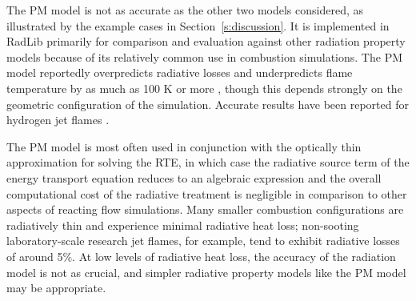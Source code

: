 \documentclass[preprint,12pt]{elsarticle}
\begin{document}
The PM model is not as accurate as the other two models considered, as illustrated by the example cases in Section~\ref{s:discussion}.
It is implemented in RadLib primarily for comparison and evaluation against other radiation property models because of its relatively common use in combustion simulations.
The PM model reportedly overpredicts radiative losses and underpredicts flame temperature by as much as 100 K or more \cite{Frank_2000,Zhu_2002,Coelho_2002}, though this depends strongly on the geometric configuration of the simulation.
Accurate results have been reported for hydrogen jet flames \cite{Barlow_1999}.

The PM model is most often used in conjunction with the optically thin approximation for solving the RTE, in which case the radiative source term of the energy transport equation reduces to an algebraic expression and the overall computational cost of the radiative treatment is negligible in comparison to other aspects of reacting flow simulations. Many smaller combustion configurations are radiatively thin and experience minimal radiative heat loss; non-sooting laboratory-scale research jet flames, for example, tend to exhibit radiative losses of around 5\%. At low levels of radiative heat loss, the accuracy of the radiation model is not as crucial, and simpler radiative property models like the PM model may be appropriate.
\end{document}
